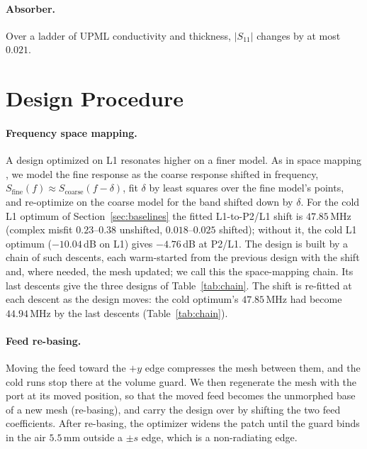 \documentclass{anvil-paper}
\newcommand{\PL}{P2/L1}
\begin{document}
\paragraph{Absorber.}
Over a ladder of UPML conductivity and thickness, $|S_{11}|$ changes by at
most $0.021$.

\section{Design Procedure}
\label{sec:procedure}

\paragraph{Frequency space mapping.}
A design optimized on L1 resonates higher on a finer model. As in space
mapping \citep{bandler1994space}, we model the
fine response as the coarse response shifted in frequency,
$S_{\mathrm{fine}}(f) \approx S_{\mathrm{coarse}}(f - \delta)$, fit $\delta$
by least squares over the fine model's points, and re-optimize on the coarse
model for the band shifted down by $\delta$. For the cold L1 optimum of
Section~\ref{sec:baselines} the fitted L1-to-\PL{} shift is $47.85$\,MHz
(complex misfit $0.23$--$0.38$ unshifted, $0.018$--$0.025$ shifted); without
it, the cold L1 optimum ($-10.04$\,dB on L1) gives $-4.76$\,dB at \PL.
The design is built by a chain of such descents, each warm-started from the
previous design with the shift and, where needed, the mesh updated; we call
this the space-mapping chain. Its last descents give the three designs of
Table~\ref{tab:chain}. The shift is re-fitted at each descent as the design
moves: the cold optimum's $47.85$\,MHz had become $44.94$\,MHz by the last
descents (Table~\ref{tab:chain}).

\paragraph{Feed re-basing.}
Moving the feed toward the $+y$ edge compresses the mesh between them, and
the cold runs stop there at the volume guard. We then regenerate the mesh
with the port at its moved position, so that the moved feed becomes the
unmorphed base of a new mesh (re-basing), and carry the design over by
shifting the two feed coefficients. After re-basing, the optimizer widens the patch
until the guard binds in the air $5.5$\,mm outside a $\pm s$ edge, which is
a non-radiating edge.
\end{document}
